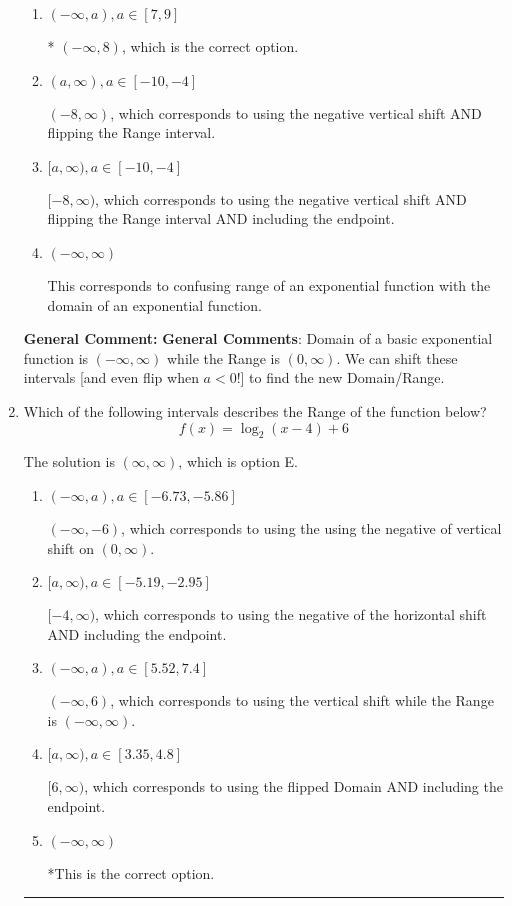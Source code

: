 \documentclass{extbook}[14pt]
\newcommand{\litem}[1]{\item #1

\rule{\textwidth}{0.4pt}}
\begin{document}
\begin{enumerate}
{\begin{enumerate}[label=\Alph*.]
$(-\infty, 8]$, which corresponds to including the endpoint.
\item \( (-\infty, a), a \in [7, 9] \)

* $(-\infty, 8)$, which is the correct option.
\item \( (a, \infty), a \in [-10, -4] \)

$(-8, \infty)$, which corresponds to using the negative vertical shift AND flipping the Range interval.
\item \( [a, \infty), a \in [-10, -4] \)

$[-8, \infty)$, which corresponds to using the negative vertical shift AND flipping the Range interval AND including the endpoint.
\item \( (-\infty, \infty) \)

This corresponds to confusing range of an exponential function with the domain of an exponential function.
\end{enumerate}

\textbf{General Comment:} \textbf{General Comments}: Domain of a basic exponential function is $(-\infty, \infty)$ while the Range is $(0, \infty)$. We can shift these intervals [and even flip when $a<0$!] to find the new Domain/Range.
}
\litem{
Which of the following intervals describes the Range of the function below?
\[ f(x) = \log_2{(x-4)}+6 \]

The solution is \( (\infty, \infty) \), which is option E.\begin{enumerate}[label=\Alph*.]
\item \( (-\infty, a), a \in [-6.73, -5.86] \)

$(-\infty, -6)$, which corresponds to using the using the negative of vertical shift on $(0, \infty)$.
\item \( [a, \infty), a \in [-5.19, -2.95] \)

$[-4, \infty)$, which corresponds to using the negative of the horizontal shift AND including the endpoint.
\item \( (-\infty, a), a \in [5.52, 7.4] \)

$(-\infty, 6)$, which corresponds to using the vertical shift while the Range is $(-\infty, \infty)$.
\item \( [a, \infty), a \in [3.35, 4.8] \)

$[6, \infty)$, which corresponds to using the flipped Domain AND including the endpoint.
\item \( (-\infty, \infty) \)

*This is the correct option.
\end{enumerate}

}
\end{enumerate}
\end{document}
